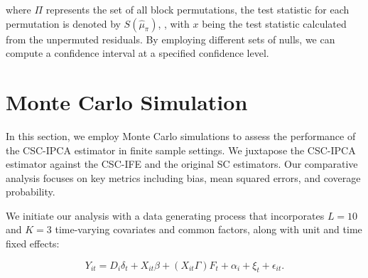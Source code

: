 \documentclass[12pt]{article}
\begin{document}
\noindent where $\Pi$ represents the set of all block permutations, the test statistic for each permutation is denoted by $S(\hat{\mu}_{\pi})$, , with $x$ being the test statistic calculated from the unpermuted residuals. By employing different sets of nulls, we can compute a confidence interval at a specified confidence level.

\section{Monte Carlo Simulation}
\label{sec: simulation}

In this section, we employ Monte Carlo simulations to assess the performance of the CSC-IPCA estimator in finite sample settings. We juxtapose the CSC-IPCA estimator against the CSC-IFE and the original SC estimators. Our comparative analysis focuses on key metrics including bias, mean squared errors, and coverage probability. 

We initiate our analysis with a data generating process that incorporates $L=10$ and $K=3$ time-varying covariates and common factors, along with unit and time fixed effects:

\begin{equation}
Y_{it} = D_{i} \delta_{t} + X_{it}\beta + (X_{it}\Gamma) F_{t} + \alpha_i + \xi_t + \epsilon_{it}.
\tag{6}
\label{eq: dgp}
\end{equation}
\end{document}

